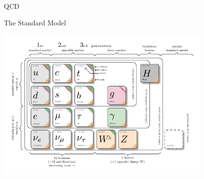 \documentclass[10pt,show notes on second screen]{beamer}
\begin{document}
\begin{frame}{QCD}



\end{frame}

\begin{frame}{The Standard Model}
    \begin{center}
        \includegraphics[width=0.8\textwidth]{../figures/illustrations/qcd/standard-model/sm.pdf}
    \end{center}
\end{frame}
\end{document}
